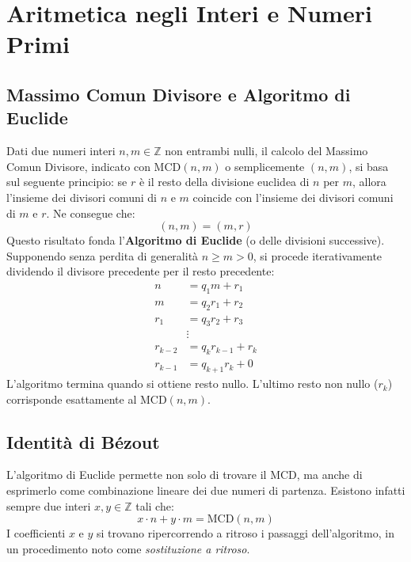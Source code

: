 \documentclass[12pt, a4paper]{article}
\begin{document}
\section{Aritmetica negli Interi e Numeri Primi}

\subsection{Massimo Comun Divisore e Algoritmo di Euclide}
Dati due numeri interi $n, m \in \mathbb{Z}$ non entrambi nulli, il calcolo del Massimo Comun Divisore, indicato con $\text{MCD}(n, m)$ o semplicemente $(n, m)$, si basa sul seguente principio: se $r$ è il resto della divisione euclidea di $n$ per $m$, allora l'insieme dei divisori comuni di $n$ e $m$ coincide con l'insieme dei divisori comuni di $m$ e $r$. Ne consegue che:
\[ (n, m) = (m, r) \]
Questo risultato fonda l'\textbf{Algoritmo di Euclide} (o delle divisioni successive). Supponendo senza perdita di generalità $n \ge m > 0$, si procede iterativamente dividendo il divisore precedente per il resto precedente:
\begin{align*}
    n &= q_1 m + r_1 \\
    m &= q_2 r_1 + r_2 \\
    r_1 &= q_3 r_2 + r_3 \\
    &\vdots \\
    r_{k-2} &= q_k r_{k-1} + r_k \\
    r_{k-1} &= q_{k+1} r_k + 0
\end{align*}
L'algoritmo termina quando si ottiene resto nullo. L'ultimo resto non nullo ($r_k$) corrisponde esattamente al $\text{MCD}(n, m)$.

\subsection{Identità di Bézout}
L'algoritmo di Euclide permette non solo di trovare il MCD, ma anche di esprimerlo come combinazione lineare dei due numeri di partenza. Esistono infatti sempre due interi $x, y \in \mathbb{Z}$ tali che:
\[ x \cdot n + y \cdot m = \text{MCD}(n, m) \]
I coefficienti $x$ e $y$ si trovano ripercorrendo a ritroso i passaggi dell'algoritmo, in un procedimento noto come \emph{sostituzione a ritroso}.
\end{document}
